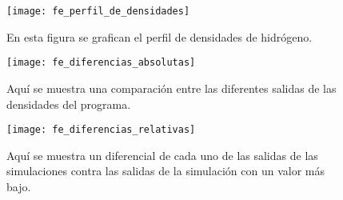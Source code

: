 \begin{figure}[h]
\centering
\texttt{[image: fe\_perfil\_de\_densidades]}
\caption{ En esta figura se grafican el perfil de densidades de hidr\'ogeno.}
\label{fe_perfil_de_densidades}
\end{figure}


\begin{figure}[h]
\centering
\texttt{[image: fe\_diferencias\_absolutas]}
\caption{ Aqu\'i se muestra una comparaci\'on entre las diferentes salidas de las densidades del programa.}
\label{fe_diferencias_absolutas}
\end{figure}

\begin{figure}[h]
\centering
\texttt{[image: fe\_diferencias\_relativas]}
\caption{ Aqu\'i se muestra un diferencial de cada uno de las salidas de las simulaciones contra las salidas de la simulaci\'on con un valor m\'as bajo.}
\label{fe_diferencias_relativas}
\end{figure}
